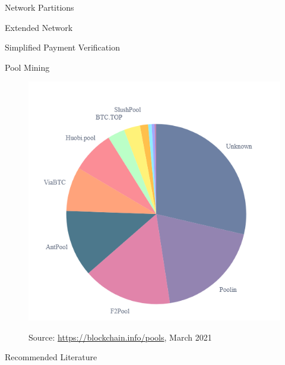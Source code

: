 \documentclass[handout]{beamer}
\begin{document}
\begin{frame}{Network Partitions}
	\centering
	\begin{tikzpicture}[scale=1, every node/.style={scale=1}]
		
	\end{tikzpicture}
\end{frame}


\begin{frame}{Extended Network}
	\centering
	\begin{tikzpicture}[scale=1, every node/.style={scale=1}]
		
	\end{tikzpicture}
\end{frame}

\begin{frame}{Simplified Payment Verification}

\end{frame}

\begin{frame}{Pool Mining}
	\centering
	\begin{figure}[t]
		\includegraphics[height = 0.8\textheight]{../assets/images/mining_pools}
		
		Source: \link \url{https://blockchain.info/pools}, March 2021
	\end{figure}
\end{frame}

\begin{frame}{Recommended Literature}
	
\end{frame}
\end{document}
